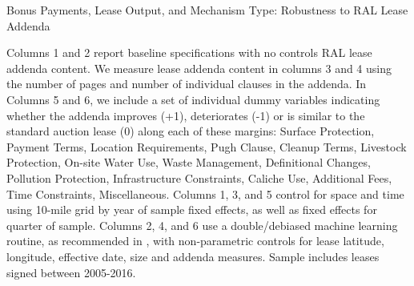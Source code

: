 \documentclass[12pt]{article}
\begin{document}
\begin{appendices}
\begin{table}[H]
\begin{center}
\begin{threeparttable}
	\caption{Bonus Payments, Lease Output, and Mechanism Type: Robustness to RAL Lease Addenda}
	\label{tab:table_bonus_addenda}
 	\small
   	            
    \footnotesize
    \begin{tablenotes}
    	\item Columns 1 and 2 report baseline specifications with no controls RAL lease addenda content.  We measure lease addenda content in columns 3 and 4 using the number of pages and number of individual clauses in the addenda.  In Columns 5 and 6, we include a set of individual dummy variables indicating whether the addenda improves (+1), deteriorates (-1) or is similar to the standard auction lease (0) along each of these margins: Surface Protection, Payment Terms, Location Requirements, Pugh Clause, Cleanup Terms, Livestock Protection, On-site Water Use, Waste Management, Definitional Changes, Pollution Protection, Infrastructure Constraints, Caliche Use, Additional Fees, Time Constraints, Miscellaneous. Columns 1, 3, and 5 control for space and time using 10-mile grid by year of sample fixed effects, as well as fixed effects for quarter of sample.  Columns 2, 4, and 6 use a double/debiased machine learning routine, as recommended in \cite{chernozhukov2018double}, with non-parametric controls for lease latitude, longitude, effective date, size and addenda measures.  Sample includes leases signed between 2005-2016.
    \end{tablenotes}
\end{threeparttable}
\end{center}
\end{table}

\end{appendices}
\end{document}
